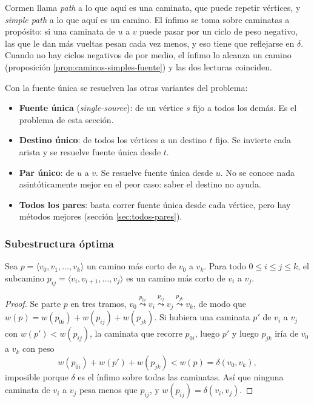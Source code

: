 \documentclass[11pt,letterpaper]{article}
\begin{document}
\begin{observacion}
  Cormen llama \textit{path} a lo que aquí es una caminata, que puede
  repetir vértices, y \textit{simple path} a lo que aquí es un camino.
  El ínfimo se toma sobre caminatas a propósito: si una caminata de
  $u$ a $v$ puede pasar por un ciclo de peso negativo, las que le dan
  más vueltas pesan cada vez menos, y eso tiene que reflejarse en
  $\delta$. Cuando no hay ciclos negativos de por medio, el ínfimo lo
  alcanza un camino (proposición \ref{prop:caminos-simples-fuente}) y
  las dos lecturas coinciden.
\end{observacion}

Con la fuente única se resuelven las otras variantes del problema:
\begin{itemize}[itemsep=0.1em]
  \item \textbf{Fuente única} (\textit{single-source}): de un vértice
        $s$ fijo a todos los demás. Es el problema de esta sección.
  \item \textbf{Destino único}: de todos los vértices a un destino
        $t$ fijo. Se invierte cada arista y se resuelve fuente única
        desde $t$.
  \item \textbf{Par único}: de $u$ a $v$. Se resuelve fuente única
        desde $u$. No se conoce nada asintóticamente mejor en el peor
        caso: saber el destino no ayuda.
  \item \textbf{Todos los pares}: basta correr fuente única desde
        cada vértice, pero hay métodos mejores (sección
        \ref{sec:todos-pares}).
\end{itemize}

\subsubsection*{Subestructura óptima}

\begin{lema}\label{lem:subcaminos-cortos}
  Sea $p = \langle v_0, v_1, \dots, v_k\rangle$ un camino más corto
  de $v_0$ a $v_k$. Para todo $0 \le i \le j \le k$, el subcamino
  $p_{ij} = \langle v_i, v_{i+1}, \dots, v_j\rangle$ es un camino más
  corto de $v_i$ a $v_j$.
\end{lema}

\begin{proof}
  Se parte $p$ en tres tramos,
  $v_0 \overset{p_{0i}}{\leadsto} v_i \overset{p_{ij}}{\leadsto} v_j
  \overset{p_{jk}}{\leadsto} v_k$, de modo que
  $w(p) = w(p_{0i}) + w(p_{ij}) + w(p_{jk})$. Si hubiera una caminata
  $p'$ de $v_i$ a $v_j$ con $w(p') < w(p_{ij})$, la caminata que
  recorre $p_{0i}$, luego $p'$ y luego $p_{jk}$ iría de $v_0$ a $v_k$
  con peso
  \[
    w(p_{0i}) + w(p') + w(p_{jk}) < w(p) = \delta(v_0, v_k) ,
  \]
  imposible porque $\delta$ es el ínfimo sobre todas las caminatas.
  Así que ninguna caminata de $v_i$ a $v_j$ pesa menos que $p_{ij}$, y
  $w(p_{ij}) = \delta(v_i, v_j)$.
\end{proof}
\end{document}
